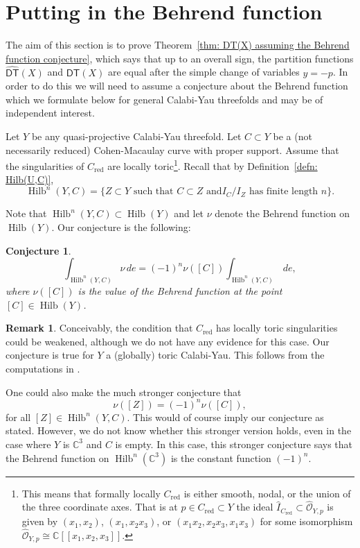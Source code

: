 \documentclass[12pt]{amsart}
\newtheorem{conjecture}[theorem]{Conjecture}
\theoremstyle{definition}
\newtheorem{remark}[theorem]{Remark}
\newcommand{\CC} {\mathbb{C}}          %
\newcommand{\Hilb}{\operatorname{Hilb}}
\newcommand{\DT}{\mathsf{DT}}
\newcommand{\DThat}{\widehat{\DT}}
\newcommand{\red}{\mathrm{red}}
\begin{document}
\section{Putting in the Behrend function} \label{sec: Behrend}

The aim of this section is to prove Theorem~\ref{thm: DT(X) assuming
the Behrend function conjecture}, which says that up to an overall
sign, the partition functions $\DThat (X)$ and $\DT (X)$ are equal
after the simple change of variables $y=-p$. In order to do this we
will need to assume a conjecture about the Behrend function which we
formulate below for general Calabi-Yau threefolds and may be of
independent interest.

Let $Y$ be any quasi-projective Calabi-Yau
threefold.  Let $C\subset Y$ be a (not necessarily reduced)
Cohen-Macaulay curve with proper support. Assume that the
singularities of $C_{\red}$ are locally toric\footnote{This means that
formally locally $C_{\red}$ is either smooth, nodal, or the union of
the three coordinate axes. That is at $p\in C_{\red}\subset Y$ the
ideal $\widehat{I}_{C_{\red}}\subset \widehat{\mathcal{O}}_{Y,p}$ is
given by $(x_{1},x_{2})$, $(x_{1},x_{2}x_{3})$, or
$(x_{1}x_{2},x_{2}x_{3},x_{1}x_{3})$ for some isomorphism
$\widehat{\mathcal{O}}_{Y,p}\cong \CC
[[x_{1},x_{2},x_{3}]]$. }. Recall that by Definition~\ref{defn:
Hilb(U,C)}, 
\[
\Hilb^{n}(Y,C) = \{Z\subset Y \text{ such that $C\subset Z$ and
$I_{C}/I_{Z}$ has finite length $n$} \}.
\]

Note that $\Hilb^{n}(Y,C)\subset \Hilb (Y)$ and let $\nu$ denote the
Behrend function on $\Hilb (Y)$. Our conjecture is the following:

\begin{conjecture}\label{conj: Behrend fnc conj}
\[
\int_{\Hilb^{n}(Y,C)} \nu \, de = (-1)^{n} \nu ([C]) \int_{\Hilb^{n}(Y,C)} \, de,
\]
where $\nu ([C])$ is the value of the Behrend function at the point $[C]\in \Hilb (Y)$.
\end{conjecture}

\begin{remark}
Conceivably, the condition that $C_{\red}$ has locally toric
singularities could be weakened, although we do not have any evidence
for this case. Our conjecture is true for $Y$ a (globally) toric
Calabi-Yau. This follows from the computations in \cite{MNOP1}.

One could also make the much stronger conjecture that 
\[
\nu ([Z]) = (-1)^{n} \nu ([C]),
\]
for all $[Z]\in \Hilb^{n}(Y,C)$. This would of course imply our
conjecture as stated. However, we do not know whether this stronger version
holds, even in the case where $Y$ is $\CC^{3}$ and $C$ is empty. In
this case, this stronger conjecture says that the Behrend function
on $\Hilb^{n}(\CC^{3})$ is the constant function $(-1)^{n}$.
\end{remark}
\end{document}
